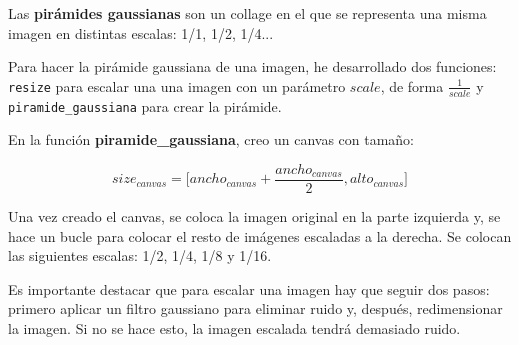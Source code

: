 \documentclass[11pt,a4paper]{article}
\theoremstyle{plain}
\theoremstyle{definition}
\begin{document}
Las \textbf{pirámides gaussianas} son un collage en el que se representa una misma imagen en distintas escalas: 1/1, 1/2, 1/4...

Para hacer la pirámide gaussiana de una imagen, he desarrollado dos funciones: \texttt{resize} para escalar una una imagen con un parámetro $scale$, de forma $\frac{1}{scale}$ y \texttt{piramide\_gaussiana} para crear la pirámide.

En la función \textbf{piramide\_gaussiana}, creo un canvas con tamaño:

\begin{displaymath}
size_{canvas} = \bigg [ ancho_{canvas} + \frac{ancho_{canvas}}{2}, alto_{canvas} \bigg ]
\end{displaymath}

Una vez creado el canvas, se coloca la imagen original en la parte izquierda y, se hace un bucle para colocar el resto de imágenes escaladas a la derecha. Se colocan las siguientes escalas: 1/2, 1/4, 1/8 y 1/16.

Es importante destacar que para escalar una imagen hay que seguir dos pasos: primero aplicar un filtro gaussiano para eliminar ruido y, después, redimensionar la imagen. Si no se hace esto, la imagen escalada tendrá demasiado ruido.
\end{document}
